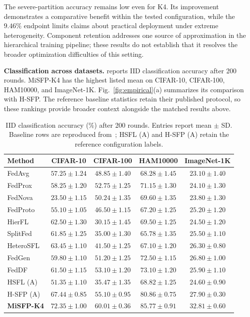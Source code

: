 The severe-partition accuracy remains low even for K4. Its improvement demonstrates a comparative benefit within the tested configuration, while the $9.46\%$ endpoint limits claims about practical deployment under extreme heterogeneity. Component retention addresses one source of approximation in the hierarchical training pipeline; these results do not establish that it resolves the broader optimization difficulties of this setting.

\noindent\textbf{Classification across datasets.}  reports IID classification accuracy after 200 rounds. MiSFP-K4 has the highest listed mean on CIFAR-10, CIFAR-100, HAM10000, and ImageNet-1K. Fig.~\ref{fig:empirical}(a) summarizes its comparison with H-SFP. The reference baseline statistics retain their published protocol, so these rankings provide broader context alongside the matched results above.

\begin{table}[t]
\caption{IID classification accuracy (\%) after 200 rounds. Entries report mean $\pm$ SD. Baseline rows are reproduced from~\cite{tran2026h}; HSFL (A) and H-SFP (A) retain the reference configuration labels.}
\label{tab:classification200}
\centering
\begin{tabular*}{\textwidth}{@{\extracolsep{\fill}}lcccc@{}}
\toprule
Method & CIFAR-10 & CIFAR-100 & HAM10000 & ImageNet-1K\\
\midrule
FedAvg & $57.25\pm1.24$ & $48.85\pm1.40$ & $68.28\pm1.45$ & $23.10\pm1.40$\\
FedProx & $58.25\pm1.20$ & $52.75\pm1.25$ & $71.15\pm1.30$ & $24.10\pm1.30$\\
FedNova & $23.50\pm1.15$ & $50.24\pm1.35$ & $69.60\pm1.35$ & $23.80\pm1.30$\\
FedProto & $55.10\pm1.05$ & $46.50\pm1.15$ & $67.20\pm1.25$ & $25.20\pm1.20$\\
HierFL & $62.50\pm1.30$ & $30.15\pm1.45$ & $69.50\pm1.25$ & $24.50\pm1.20$\\
SplitFed & $61.85\pm1.25$ & $35.00\pm1.30$ & $65.78\pm1.35$ & $25.50\pm1.10$\\
HeteroSFL & $63.45\pm1.10$ & $41.50\pm1.25$ & $67.10\pm1.20$ & $26.30\pm0.80$\\
FedGen & $59.80\pm1.10$ & $51.20\pm1.25$ & $72.50\pm1.15$ & $26.80\pm1.00$\\
FedDF & $61.50\pm1.15$ & $53.10\pm1.20$ & $73.10\pm1.20$ & $25.90\pm1.10$\\
HSFL (A) & $51.35\pm1.10$ & $35.47\pm1.35$ & $68.82\pm1.25$ & $24.60\pm0.90$\\
H-SFP (A) & $67.44\pm0.85$ & $55.10\pm0.95$ & $80.86\pm0.75$ & $27.90\pm0.30$\\
\midrule
\textbf{MiSFP-K4} & $\mathbf{72.35\pm1.00}$ & $\mathbf{60.01\pm0.36}$ & $\mathbf{85.77\pm0.91}$ & $\mathbf{32.81\pm0.60}$\\
\bottomrule
\end{tabular*}
\end{table}

